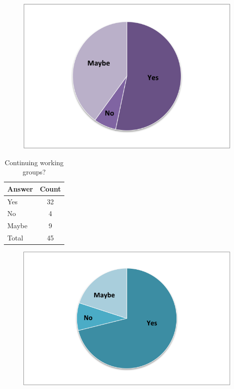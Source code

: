 \begin{figure}[h]
\includegraphics{SurveyFig5}
\label{fig:SFig5}
\end{figure}



\begin{table}[h!]
\centering
\caption{Continuing working groups?}
\label{tab:survey_continuing_wgs}
\begin{tabular}{|l|c|}
\hline
{\bf Answer} &
{\bf Count} \\ \hline
Yes &
32 \\
No &
4 \\
Maybe &
9 \\
Total &
45 \\
\hline
\end{tabular}
\end{table}

\begin{figure}[h]
\includegraphics{SurveyFig6}
\label{fig:SFig6}
\end{figure}

